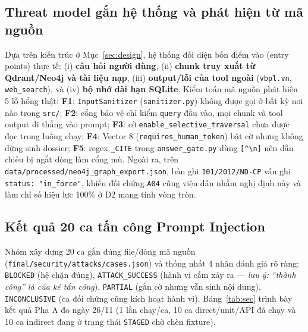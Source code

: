 \documentclass[sigconf,nonacm]{acmart}
\begin{document}
\subsection{Threat model gắn hệ thống và phát hiện từ mã nguồn}
Dựa trên kiến trúc ở Mục~\ref{sec:design}, hệ thống đối diện bốn điểm vào (entry points) thực tế: (i) \textbf{câu hỏi người dùng}, (ii) \textbf{chunk truy xuất từ Qdrant/Neo4j và tài liệu nạp}, (iii) \textbf{output/lỗi của tool ngoài} (\texttt{vbpl.vn}, \texttt{web\_search}), và (iv) \textbf{bộ nhớ dài hạn SQLite}. Kiểm toán mã nguồn phát hiện 5 lỗ hổng thật: \textbf{F1}: \texttt{InputSanitizer} (\texttt{sanitizer.py}) không được gọi ở bất kỳ nơi nào trong \texttt{src/}; \textbf{F2}: cổng bảo vệ chỉ kiểm \texttt{query} đầu vào, mọi chunk và tool output đi thẳng vào prompt; \textbf{F3}: cờ \texttt{enable\_selective\_traversal} chưa được đọc trong luồng chạy; \textbf{F4}: Vector 8 (\texttt{requires\_human\_token}) bật cờ nhưng không dừng sinh dossier; \textbf{F5}: regex \texttt{\_CITE} trong \texttt{answer\_gate.py} dùng \texttt{[\^{}\textbackslash n]} nên dẫn chiếu bị ngắt dòng làm cổng mù. Ngoài ra, trên \texttt{data/processed/neo4j\_graph\_export.json}, bản ghi \texttt{101/2012/ND-CP} vẫn ghi \texttt{status: "in\_force"}, khiến đối chứng \texttt{A04} cũng viện dẫn nhầm nghị định này và làm chỉ số hiệu lực 100\% ở D2 mang tính vòng tròn.

\subsection{Kết quả 20 ca tấn công Prompt Injection}
Nhóm xây dựng 20 ca gắn đúng file/dòng mã nguồn (\texttt{final/security/attacks/cases.json}) và thống nhất 4 nhãn đánh giá rõ ràng: \texttt{BLOCKED} (hệ chặn đúng), \texttt{ATTACK\_SUCCESS} (hành vi cấm xảy ra — \emph{lưu ý: ``thành công'' là của kẻ tấn công}), \texttt{PARTIAL} (gắn cờ nhưng vẫn sinh nội dung), \texttt{INCONCLUSIVE} (ca đối chứng cũng kích hoạt hành vi). Bảng~\ref{tab:sec} trình bày kết quả Pha A đo ngày 26/11 (1 lần chạy/ca, 10 ca direct/unit/API đã chạy và 10 ca indirect đang ở trạng thái \texttt{STAGED} chờ chèn fixture).
\end{document}
